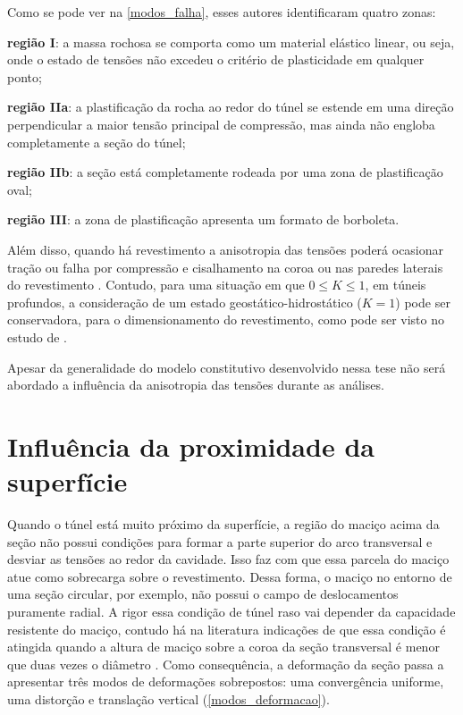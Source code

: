 Como se pode ver na \autoref{modos_falha}, esses autores identificaram quatro zonas:

\begin{alineas}
	\item \textbf{região I}: a massa rochosa se comporta como um material elástico linear, ou seja, onde o estado de tensões não excedeu o critério de plasticidade em qualquer ponto;
	\item \textbf{região IIa}: a plastificação da rocha ao redor do túnel se estende em uma direção perpendicular a maior tensão principal de compressão, mas ainda não engloba completamente a seção do túnel;
	\item \textbf{região IIb}: a seção está completamente rodeada por uma zona de plastificação oval;
	\item \textbf{região III}: a zona de plastificação apresenta um formato de borboleta.
\end{alineas}

Além disso, quando há revestimento a anisotropia das tensões poderá ocasionar tração ou falha por compressão e cisalhamento na coroa ou nas paredes laterais do revestimento \cite{Brady2006}. Contudo, para uma situação em que $0 \leq K \leq 1$, em túneis profundos, a consideração de um estado geostático-hidrostático ($K=1$) pode ser conservadora, para o dimensionamento do revestimento, como pode ser visto no estudo de .

Apesar da generalidade do modelo constitutivo desenvolvido nessa tese não será abordado a influência da anisotropia das tensões durante as análises.


\section{Influência da proximidade da superfície}

Quando o túnel está muito próximo da superfície, a região do maciço acima da seção não possui condições para formar a parte superior do arco transversal e desviar as tensões ao redor da cavidade. Isso faz com que essa parcela do maciço atue como sobrecarga sobre o revestimento. Dessa forma, o maciço no entorno de uma seção circular, por exemplo, não possui o campo de deslocamentos puramente radial. A rigor essa condição de túnel raso vai depender da capacidade resistente do maciço, contudo há na literatura indicações de que essa condição é atingida quando a altura de maciço sobre a coroa da seção transversal é menor que duas vezes o diâmetro \cite[p. 67]{Chapman2018}. Como consequência, a deformação da seção passa a apresentar três modos de deformações sobrepostos: uma convergência uniforme, uma distorção e translação vertical (\autoref{modos_deformacao}).

